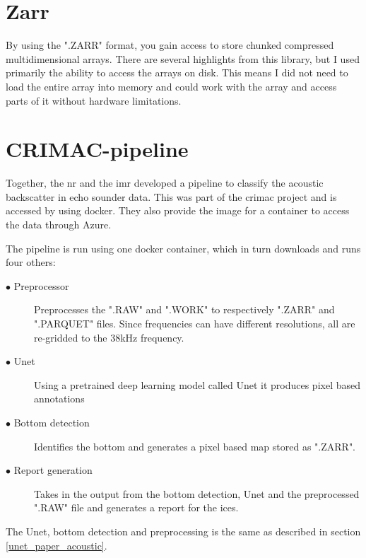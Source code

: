     \section{Zarr}
        By using the ".ZARR"\cite{zarr} format, you gain access to store chunked compressed  multidimensional arrays. There are several highlights from this library, but I used primarily the ability to access the arrays on disk. This means I did not need to load the entire array into memory and could work with the array and access parts of it without hardware limitations.
        
        
    \section{CRIMAC-pipeline}
        Together, the \gls{nr} and the \gls{imr} developed a pipeline\cite{crimac_pipeline} to classify the acoustic backscatter in echo sounder data. This was part of the \gls{crimac} project and is accessed by using docker. They also provide the image for a container to access the data through Azure.
        
        The pipeline is run using one docker container, which in turn downloads and runs four others:
        
            \begin{description}
              \item[$\bullet$ Preprocessor] Preprocesses the ".RAW" and ".WORK" to respectively ".ZARR" and ".PARQUET" files. Since frequencies can have different resolutions, all are re-gridded to the 38kHz frequency.
              \item[$\bullet$ Unet] Using a pretrained deep learning model called Unet it produces pixel based annotations
              \item[$\bullet$ Bottom detection] Identifies the bottom and generates a pixel based map stored as ".ZARR".
              \item[$\bullet$ Report generation] Takes in the output from the bottom detection, Unet and the preprocessed ".RAW" file and generates a report for the \gls{ices}.
    
            \end{description}
        
        
        
        
        
        The Unet, bottom detection and preprocessing is the same as described in section \ref{unet_paper_acoustic}.
        

